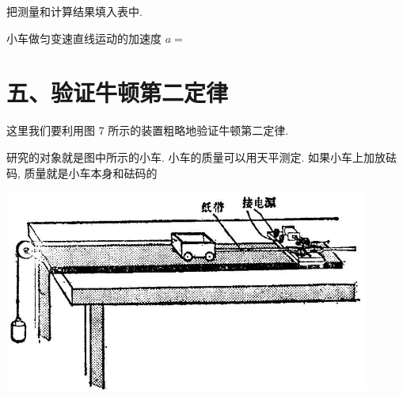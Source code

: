 \documentclass[10pt]{article}
\begin{document}
把测量和计算结果填入表中.

\begin{center}
\end{center}

小车做匀变速直线运动的加速度 \(a =\)

\section*{五、验证牛顿第二定律}

这里我们要利用图 7 所示的装置粗略地验证牛顿第二定律.

研究的对象就是图中所示的小车. 小车的质量可以用天平测定. 如果小车上加放砝码, 质量就是小车本身和砝码的

\begin{center}
\includegraphics[max width=0.9\textwidth]{images/01912d55-147c-70aa-b0e0-1782a122f948_323_487713.jpg}
\end{center}
\end{document}
